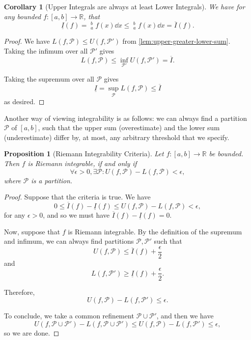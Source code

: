 \documentclass[11pt]{article}
\numberwithin{equation}{section}
\newtheorem{proposition}[theorem]{Proposition}
\newtheorem{corollary}[theorem]{Corollary}
\theoremstyle{definition}
\theoremstyle{remark}
\newcommand{\pqty}[1]{\left(#1\right)}
\newcommand{\ccintv}[2]{[#1,#2]}
\newcommand{\functiondomain}[3]{#1:#2\to #3}
\newcommand{\RR}{\mathbb R}
\newcommand{\partition}{\mathcal P}
\newcommand{\upperSum}{U}
\newcommand{\lowerSum}{L}
\newcommand{\upperI}{\overline I}
\newcommand{\lowerI}{\underline I}
\newcommand{\upperInt}{\mathop{\overline{\int}}\nolimits}
\newcommand{\lowerInt}{\mathop{\underline{\int}}\nolimits}
\begin{document}
\begin{corollary}[Upper Integrals are always at least Lower Integrals]\label{analysis-unit-0146}
    \label{cor:upper-greater-lower-int}%
    We have for any bounded \(\functiondomain{f}{\ccintv{a}{b}}{\RR}\), that
    \[
        \lowerI\pqty{f} = \lowerInt_{a}^{b} f\pqty{x} \dd{x} \leq \upperInt_{a}^{b} f\pqty{x} \dd{x} = \upperI \pqty{f}.
    \]
\end{corollary}

\begin{proof}
    We have \(\lowerSum\pqty{f, \partition} \leq \upperSum\pqty{f, \partition'}\) from \autoref{lem:upper-greater-lower-sum}. Taking the infimum over all \(\partition'\) gives
    \[
        \lowerSum\pqty{f, \partition} \leq \inf_{\partition'} \upperSum\pqty{f, \partition'} = \upperI.
    \]

    Taking the supremum over all \(\partition\) gives
    \[
        \lowerI = \sup_{\partition} \lowerSum\pqty{f, \partition} \leq \upperI
    \]
    as desired.
\end{proof}

Another way of viewing integrability is as follows: we can always find a partition \(\partition\) of \(\ccintv{a}{b}\), such that the upper sum (overestimate) and the lower sum (underestimate) differ by, at most, any arbitrary threshold that we specify.

\begin{proposition}[Riemann Integrability Criteria]\label{analysis-unit-0147}
    \label{prop:riemann-integrability-criteria}%
    Let \(\functiondomain{f}{\ccintv{a}{b}}{\RR}\) be bounded. Then \(f\) is Riemann integrable, if and only if
    \[
        \forall \epsilon > 0, \exists \partition: \upperSum\pqty{f, \partition} - \lowerSum\pqty{f, \partition} < \epsilon,
    \]
    where \(\partition\) is a partition.
\end{proposition}

\begin{proof}
    Suppose that the criteria is true. We have
    \[
        0 \leq \upperI\pqty{f} - \lowerI\pqty{f} \leq \upperSum\pqty{f, \partition} - \lowerSum\pqty{f, \partition} < \epsilon,
    \]
    for any \(\epsilon > 0\), and so we must have \(\upperI\pqty{f} - \lowerI\pqty{f} = 0\).

    Now, suppose that \(f\) is Riemann integrable. By the definition of the supremum and infimum, we can always find partitions \(\partition, \partition'\) such that
    \[
        \upperSum\pqty{f, \partition} \leq \upperI\pqty{f} + \frac{\epsilon}{2}
    \]
    and
    \[
        \lowerSum\pqty{f, \partition'} \geq \lowerI\pqty{f} + \frac{\epsilon}{2}.
    \]

    Therefore,
    \[
        \upperSum\pqty{f, \partition} - \lowerSum\pqty{f, \partition'} \leq \epsilon.
    \]

    To conclude, we take a common refinement \(\partition \cup \partition'\), and then we have
    \[
        \upperSum\pqty{f, \partition \cup \partition'} - \lowerSum\pqty{f, \partition \cup \partition'} \leq \upperSum\pqty{f, \partition} - \lowerSum\pqty{f, \partition'} \leq \epsilon,
    \]
    so we are done.
\end{proof}
\end{document}
